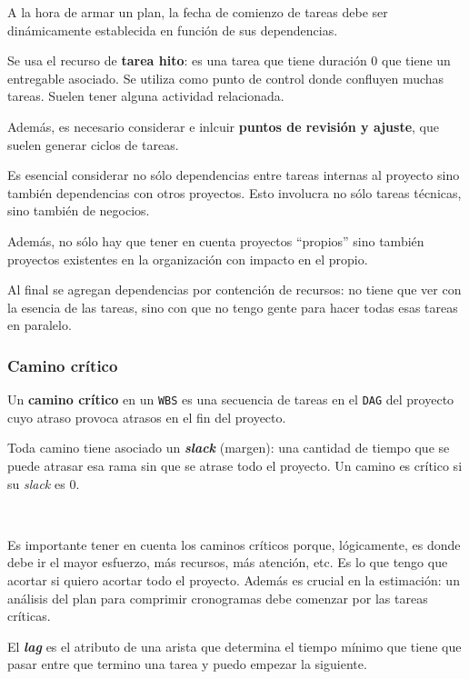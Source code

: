 \documentclass[]{article}
\begin{document}
A la hora de armar un plan, la fecha de comienzo de tareas debe ser dinámicamente establecida en función de sus dependencias.

Se usa el recurso de \textbf{tarea hito}: es una tarea que tiene duración 0 que tiene un entregable asociado. Se utiliza como punto de control donde confluyen muchas tareas. Suelen tener alguna actividad relacionada.

Además, es necesario considerar e inlcuir \textbf{puntos de revisión y ajuste}, que suelen generar ciclos de tareas.

Es esencial considerar no sólo dependencias entre tareas internas al proyecto sino también dependencias con otros proyectos. Esto involucra no sólo tareas técnicas, sino también de negocios.

Además, no sólo hay que tener en cuenta proyectos ``propios'' sino también proyectos existentes en la organización con impacto en el propio.

Al final se agregan dependencias por contención de recursos: no tiene que ver con la esencia de las tareas, sino con que no tengo gente para hacer todas esas tareas en paralelo.


\subsubsection{Camino crítico}
Un \textbf{camino crítico} en un \texttt{WBS} es una secuencia de tareas en el \texttt{DAG} del proyecto cuyo atraso provoca atrasos en el fin del proyecto.

Toda camino tiene asociado un \emph{\textbf{slack}} (margen): una cantidad de tiempo que se puede atrasar esa rama sin que se atrase todo el proyecto. Un camino es crítico si su \emph{slack} es 0.


~\newline

Es importante tener en cuenta los caminos críticos porque, lógicamente, es donde debe ir el mayor esfuerzo, más recursos, más atención, etc. Es lo que tengo que acortar si quiero acortar todo el proyecto. Además es crucial en la estimación: un análisis del plan para comprimir cronogramas debe comenzar por las tareas críticas.

El \emph{\textbf{lag}} es el atributo de una arista que determina el tiempo mínimo que tiene que pasar entre que termino una tarea y puedo empezar la siguiente.
\end{document}
